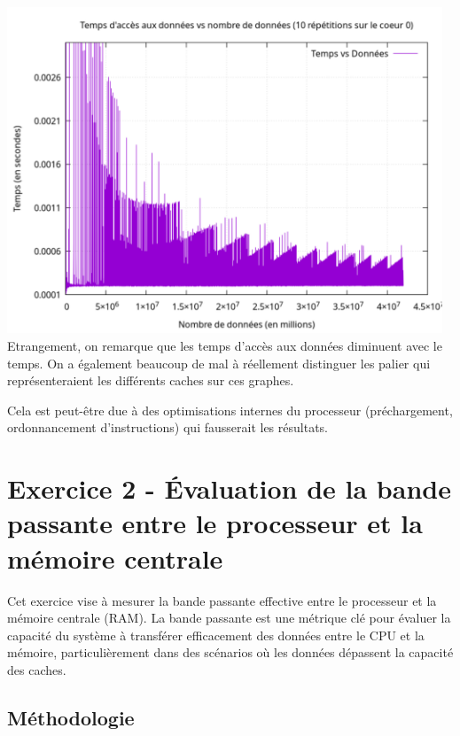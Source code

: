 \documentclass{rapport}
\begin{document}
    \includegraphics[width=13cm]{img/graphrep10core.pdf} \\[1mm]
    
    Etrangement, on remarque que les temps d'accès aux données diminuent avec le temps. On a également beaucoup de mal à réellement distinguer les palier qui représenteraient les différents caches sur ces graphes.

    Cela est peut-être due à des optimisations internes du processeur (préchargement, ordonnancement d’instructions) qui fausserait les résultats.

    \section{Exercice 2 - Évaluation de la bande passante entre le processeur et la mémoire centrale}

        Cet exercice vise à mesurer la bande passante effective entre le processeur et la mémoire centrale (RAM). La bande passante est une métrique clé pour évaluer la capacité du système à transférer efficacement des données entre le CPU et la mémoire, particulièrement dans des scénarios où les données dépassent la capacité des caches.
        
        \subsection{Méthodologie}
\end{document}
